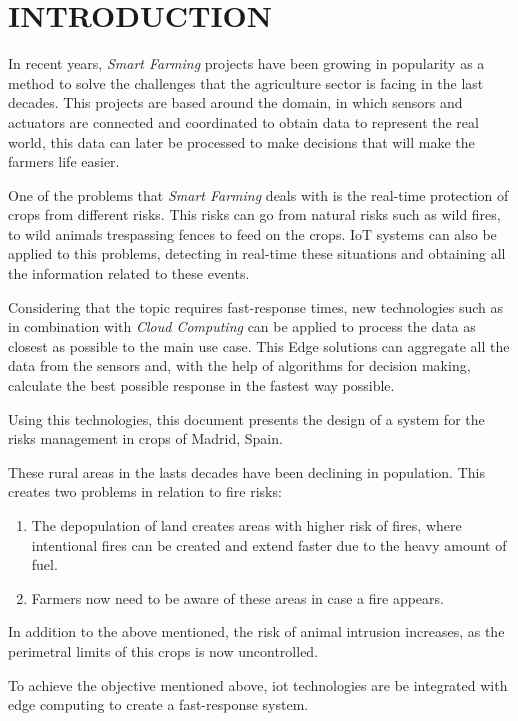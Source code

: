\section{INTRODUCTION}

In recent years, \textit{Smart Farming} projects have been growing in popularity as a method to solve the challenges that the agriculture sector is facing in the last decades. 
This projects are based around the  domain, in which sensors and actuators are connected and coordinated to obtain data to represent the real world, this data can 
later be processed to make decisions that will make the farmers life easier.

One of the problems that \textit{Smart Farming} deals with is the real-time protection of crops from different risks. This risks can go from natural 
risks such as wild fires, to wild animals trespassing fences to feed on the crops. IoT systems can also be applied to this problems, detecting in real-time 
these situations and obtaining all the information related to these events. 

Considering that the topic requires fast-response times, new technologies such as  in combination with \textit{Cloud Computing} can be applied to 
process the data as closest as possible to the main use case. This Edge solutions can aggregate all the data from the sensors and, with the help of 
algorithms for decision making, calculate the best possible response in the fastest way possible.


Using this technologies, this document presents the design of a system for the risks management in crops of Madrid, Spain. 

These rural areas in the lasts decades have been declining in population. This creates two problems in relation to fire risks:
\begin{enumerate}
    \item The depopulation of land creates areas with higher risk of fires\cite{Yanosolo}, where intentional fires can be created and extend faster due to the heavy amount of fuel.
    \item Farmers now need to be aware of these areas in case a fire appears.
\end{enumerate}

In addition to the above mentioned, the risk of animal intrusion increases\cite{importanciacazaEspana}, as the perimetral limits of this crops is now uncontrolled.

To achieve the objective mentioned above, \acrshort{iot} technologies are be integrated with edge computing to create a fast-response system.
